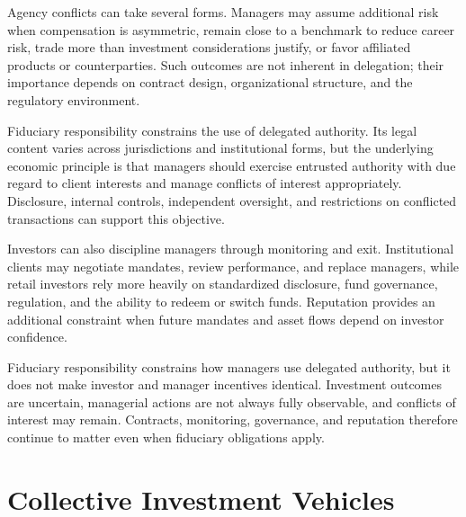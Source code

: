 Agency conflicts can take several forms. Managers may assume additional risk when compensation is asymmetric, remain close to a benchmark to reduce career risk, trade more than investment considerations justify, or favor affiliated products or counterparties. Such outcomes are not inherent in delegation; their importance depends on contract design, organizational structure, and the regulatory environment.

Fiduciary responsibility constrains the use of delegated authority. Its legal content varies across jurisdictions and institutional forms, but the underlying economic principle is that managers should exercise entrusted authority with due regard to client interests and manage conflicts of interest appropriately. Disclosure, internal controls, independent oversight, and restrictions on conflicted transactions can support this objective.

Investors can also discipline managers through monitoring and exit. Institutional clients may negotiate mandates, review performance, and replace managers, while retail investors rely more heavily on standardized disclosure, fund governance, regulation, and the ability to redeem or switch funds. Reputation provides an additional constraint when future mandates and asset flows depend on investor confidence.

\begin{tcolorbox}[
  enhanced,
  breakable,
  colback=white,
  colframe=FinanceBlue,
  boxrule=0.7pt,
  sharp corners,
  borderline west={2.2pt}{0pt}{FinanceBlue},
  title=\textbf{Financial Perspective: Fiduciary Responsibility Does Not Eliminate Agency Problems},
  coltitle=white,
  colbacktitle=FinanceBlue,
  fonttitle=\bfseries,
  before skip=1.2em,
  after skip=1.2em
]

Fiduciary responsibility constrains how managers use delegated authority, but it does not make investor and manager incentives identical. Investment outcomes are uncertain, managerial actions are not always fully observable, and conflicts of interest may remain. Contracts, monitoring, governance, and reputation therefore continue to matter even when fiduciary obligations apply.

\end{tcolorbox}

\section{Collective Investment Vehicles}

